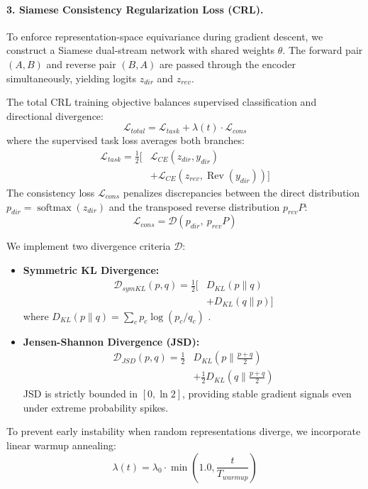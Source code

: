 \documentclass[11pt,a4paper,twocolumn]{article}
\begin{document}
\paragraph{3. Siamese Consistency Regularization Loss (CRL).}
To enforce representation-space equivariance during gradient descent, we construct a Siamese dual-stream network with shared weights $\theta$. The forward pair $(A, B)$ and reverse pair $(B, A)$ are passed through the encoder simultaneously, yielding logits $z_{dir}$ and $z_{rev}$.

The total CRL training objective balances supervised classification and directional divergence:
\begin{equation}
\mathcal{L}_{total} = \mathcal{L}_{task} + \lambda(t) \cdot \mathcal{L}_{cons}
\end{equation}
where the supervised task loss averages both branches:
\begin{equation}
\begin{aligned}
\mathcal{L}_{task} = \frac{1}{2}\Big[ &\mathcal{L}_{CE}(z_{dir}, y_{dir}) \\
&+ \mathcal{L}_{CE}(z_{rev}, \operatorname{Rev}(y_{dir})) \Big]
\end{aligned}
\end{equation}
The consistency loss $\mathcal{L}_{cons}$ penalizes discrepancies between the direct distribution $p_{dir} = \operatorname{softmax}(z_{dir})$ and the transposed reverse distribution $p_{rev} P$:
\begin{equation}
\mathcal{L}_{cons} = \mathcal{D}\left(p_{dir}, \ p_{rev} P\right)
\end{equation}

We implement two divergence criteria $\mathcal{D}$:
\begin{itemize}
    \item \textbf{Symmetric KL Divergence:}
    \begin{equation}
    \begin{aligned}
    \mathcal{D}_{symKL}(p, q) = \frac{1}{2}\Big[ &D_{KL}(p \parallel q) \\
    &+ D_{KL}(q \parallel p)\Big]
    \end{aligned}
    \end{equation}
    where $D_{KL}(p \parallel q) = \sum_c p_c \log(p_c / q_c)$ \citep{kullback1951kl}.
    \item \textbf{Jensen-Shannon Divergence (JSD):}
    \begin{equation}
    \begin{aligned}
    \mathcal{D}_{JSD}(p, q) = \frac{1}{2} &D_{KL}\left(p \parallel \frac{p+q}{2}\right) \\
    &+ \frac{1}{2} D_{KL}\left(q \parallel \frac{p+q}{2}\right)
    \end{aligned}
    \end{equation}
    JSD is strictly bounded in $[0, \ln 2]$, providing stable gradient signals even under extreme probability spikes.
\end{itemize}
To prevent early instability when random representations diverge, we incorporate linear warmup annealing:
\begin{equation}
\lambda(t) = \lambda_0 \cdot \min\left(1.0, \frac{t}{T_{warmup}}\right)
\end{equation}
\end{document}
